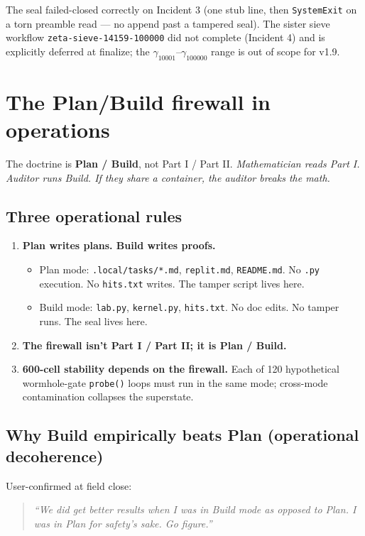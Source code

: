 \documentclass[11pt,letterpaper]{article}
\begin{document}
The seal failed-closed correctly on Incident 3 (one stub line, then
\texttt{SystemExit} on a torn preamble read --- no append past a tampered
seal). The sister sieve workflow \texttt{zeta-sieve-14159-100000} did
not complete (Incident 4) and is explicitly deferred at finalize; the
$\gamma_{10001}$--$\gamma_{100000}$ range is out of scope for v1.9.

\section{The Plan/Build firewall in operations}
\label{sec:plan-build-operations}

The doctrine is \textbf{Plan / Build}, not Part I / Part II.
\emph{Mathematician reads Part I. Auditor runs Build. If they share a
container, the auditor breaks the math.}

\subsection{Three operational rules}

\begin{enumerate}
  \item \textbf{Plan writes plans. Build writes proofs.}
    \begin{itemize}
      \item Plan mode: \texttt{.local/tasks/*.md}, \texttt{replit.md}, \texttt{README.md}. No \texttt{.py} execution. No \texttt{hits.txt} writes. The tamper script lives here.
      \item Build mode: \texttt{lab.py}, \texttt{kernel.py}, \texttt{hits.txt}. No doc edits. No tamper runs. The seal lives here.
    \end{itemize}
  \item \textbf{The firewall isn't Part I / Part II; it is Plan / Build.}
  \item \textbf{600-cell stability depends on the firewall.}
    Each of 120 hypothetical wormhole-gate \texttt{probe()} loops must run in the same mode; cross-mode contamination collapses the superstate.
\end{enumerate}

\subsection{Why Build empirically beats Plan (operational decoherence)}

User-confirmed at field close:
\begin{quote}
\itshape ``We did get better results when I was in Build mode as opposed
to Plan. I was in Plan for safety's sake. Go figure.''
\end{quote}
\end{document}
